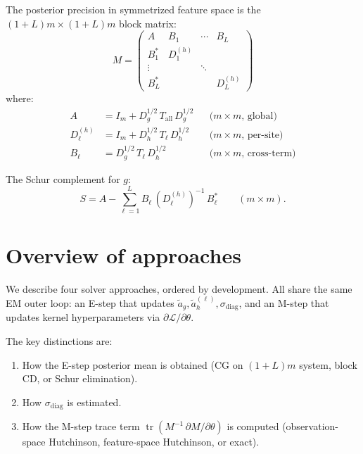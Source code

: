 \documentclass[11pt]{article}
\newcommand{\tr}{\operatorname{tr}}
\begin{document}
The posterior precision in symmetrized feature space is the
$(1+L)m \times (1+L)m$ block matrix:
\[
  M =
  \begin{pmatrix}
    A     & B_1   & \cdots & B_L \\
    B_1^* & D_1^{(h)} &     &     \\
    \vdots &      & \ddots &     \\
    B_L^* &       &        & D_L^{(h)}
  \end{pmatrix}
\]
where:
\begin{align}
  A &= I_m + D_g^{1/2}\, T_{\mathrm{all}}\, D_g^{1/2}
     & &\text{($m \times m$, global)} \label{eq:A}\\
  D_\ell^{(h)} &= I_m + D_h^{1/2}\, T_\ell\, D_h^{1/2}
     & &\text{($m \times m$, per-site)} \label{eq:D_ell}\\
  B_\ell &= D_g^{1/2}\, T_\ell\, D_h^{1/2}
     & &\text{($m \times m$, cross-term)} \label{eq:B_ell}
\end{align}

The Schur complement for $g$:
\begin{equation}\label{eq:schur}
  S = A - \sum_{\ell=1}^L B_\ell\, (D_\ell^{(h)})^{-1}\, B_\ell^*
  \qquad (m \times m).
\end{equation}

\section{Overview of approaches}

We describe four solver approaches, ordered by development.
All share the same EM outer loop: an E-step that updates
$\tilde a_g, \tilde a_h^{(\ell)}, \sigma_{\mathrm{diag}}$,
and an M-step that updates kernel hyperparameters via
$\partial\mathcal{L}/\partial\theta$.

The key distinctions are:
\begin{enumerate}
\item How the E-step posterior mean is obtained (CG on $(1+L)m$
  system, block CD, or Schur elimination).
\item How $\sigma_{\mathrm{diag}}$ is estimated.
\item How the M-step trace term
  $\tr(M^{-1}\, \partial M/\partial\theta)$ is computed
  (observation-space Hutchinson, feature-space Hutchinson, or exact).
\end{enumerate}

\end{document}

